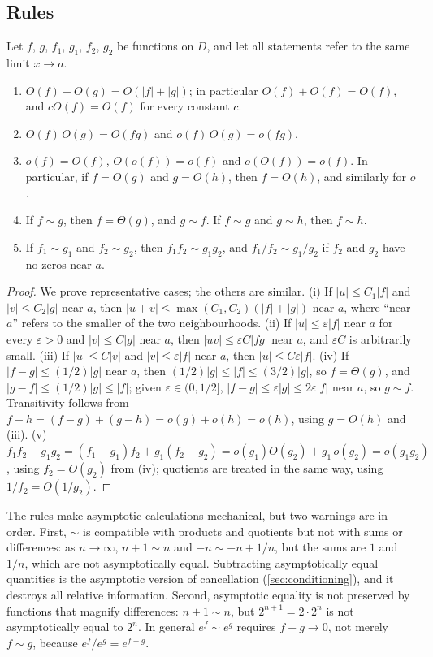 \subsection{Rules}

\begin{proposition}
\label{prop:landau-rules}
Let $f$, $g$, $f_1$, $g_1$, $f_2$, $g_2$ be functions on $D$, and let all statements refer to the same limit $x\to a$.
\begin{enumerate}
\item $O(f)+O(g)=O(|f|+|g|)$; in particular $O(f)+O(f)=O(f)$, and $cO(f)=O(f)$ for every constant $c$.
\item $O(f)\,O(g)=O(fg)$ and $o(f)\,O(g)=o(fg)$.
\item $o(f)=O(f)$, $O(o(f))=o(f)$ and $o(O(f))=o(f)$. In particular, if $f=O(g)$ and $g=O(h)$, then $f=O(h)$, and similarly for $o$.
\item If $f\sim g$, then $f=\Theta(g)$, and $g\sim f$. If $f\sim g$ and $g\sim h$, then $f\sim h$.
\item If $f_1\sim g_1$ and $f_2\sim g_2$, then $f_1f_2\sim g_1g_2$, and $f_1/f_2\sim g_1/g_2$ if $f_2$ and $g_2$ have no zeros near $a$.
\end{enumerate}
\end{proposition}

\begin{proof}
We prove representative cases; the others are similar. (i) If $|u|\le C_1|f|$ and $|v|\le C_2|g|$ near $a$, then $|u+v|\le\max(C_1,C_2)(|f|+|g|)$ near $a$, where ``near $a$'' refers to the smaller of the two neighbourhoods. (ii) If $|u|\le\varepsilon|f|$ near $a$ for every $\varepsilon>0$ and $|v|\le C|g|$ near $a$, then $|uv|\le\varepsilon C|fg|$ near $a$, and $\varepsilon C$ is arbitrarily small. (iii) If $|u|\le C|v|$ and $|v|\le\varepsilon|f|$ near $a$, then $|u|\le C\varepsilon|f|$. (iv) If $|f-g|\le(1/2)|g|$ near $a$, then $(1/2)|g|\le|f|\le(3/2)|g|$, so $f=\Theta(g)$, and $|g-f|\le(1/2)|g|\le|f|$; given $\varepsilon\in(0,1/2]$, $|f-g|\le\varepsilon|g|\le2\varepsilon|f|$ near $a$, so $g\sim f$. Transitivity follows from $f-h=(f-g)+(g-h)=o(g)+o(h)=o(h)$, using $g=O(h)$ and (iii). (v) $f_1f_2-g_1g_2=(f_1-g_1)f_2+g_1(f_2-g_2)=o(g_1)O(g_2)+g_1\,o(g_2)=o(g_1g_2)$, using $f_2=O(g_2)$ from (iv); quotients are treated in the same way, using $1/f_2=O(1/g_2)$.
\end{proof}

The rules make asymptotic calculations mechanical, but two warnings are in order. First, $\sim$ is compatible with products and quotients but not with sums or differences: as $n\to\infty$, $n+1\sim n$ and $-n\sim-n+1/n$, but the sums are $1$ and $1/n$, which are not asymptotically equal. Subtracting asymptotically equal quantities is the asymptotic version of cancellation (\cref{sec:conditioning}), and it destroys all relative information. Second, asymptotic equality is not preserved by functions that magnify differences: $n+1\sim n$, but $2^{n+1}=2\cdot2^n$ is not asymptotically equal to $2^n$. In general $e^{f}\sim e^{g}$ requires $f-g\to0$, not merely $f\sim g$, because $e^f/e^g=e^{f-g}$.

